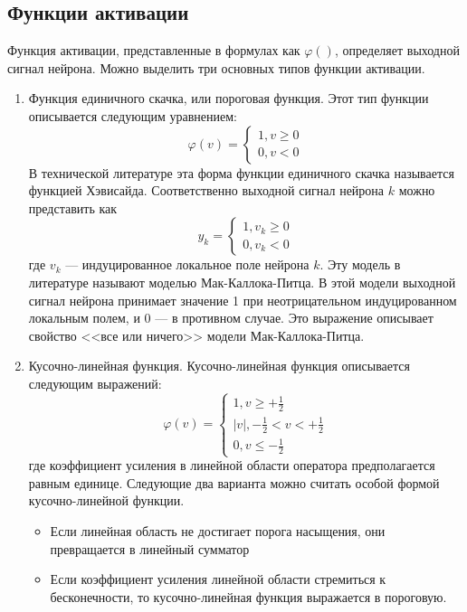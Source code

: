 \subsection{Функции активации}
Функция активации, представленные в формулах как $\varphi()$, определяет выходной сигнал нейрона.
Можно выделить три основных типов функции активации.
\begin{enumerate}
\item Функция единичного скачка, или пороговая функция.
Этот тип функции описывается следующим уравнением:
\begin{equation}
\varphi(v) = 
\begin{cases}
1, v \ge 0\\
0, v < 0
\end{cases}
\end{equation}
В технической литературе эта форма функции единичного скачка называется функцией Хэвисайда.
Соответственно выходной сигнал нейрона $k$ можно представить как
\begin{equation}
y_k = 
\begin{cases}
1, v_k \ge 0\\
0, v_k < 0
\end{cases}
\end{equation}
где $v_k$ --- индуцированное локальное поле нейрона $k$.
Эту модель в литературе называют моделью Мак-Каллока-Питца. В этой модели выходной сигнал нейрона принимает значение 1 при неотрицательном индуцированном локальным полем, и 0 --- в противном случае.
Это выражение описывает свойство <<все или ничего>> модели Мак-Каллока-Питца.
\item Кусочно-линейная функция. Кусочно-линейная функция описывается следующим выражений:
\begin{equation}
\varphi(v) = 
\begin{cases}
1, v \ge +\frac12\\
|v|, -\frac12<v<+\frac12\\
0, v \le -\frac12
\end{cases}
\end{equation}
где коэффициент усиления в линейной области оператора предполагается равным единице.
Следующие два варианта можно считать особой формой кусочно-линейной функции.
\begin{itemize}
\item Если линейная область не достигает порога насыщения, они превращается в линейный сумматор 
\item Если коэффициент усиления линейной области стремиться к бесконечности, то кусочно-линейная функция выражается в пороговую.

\end{itemize}
\end{enumerate}
